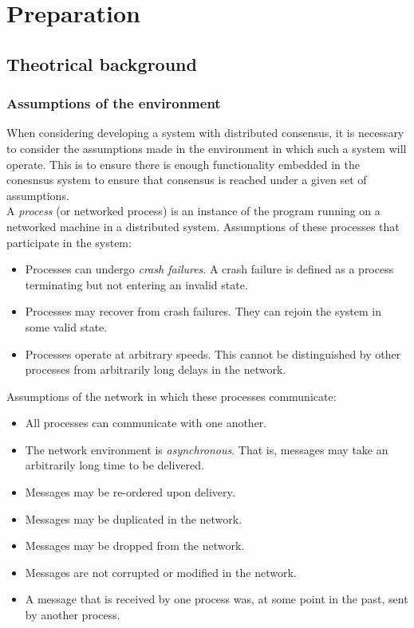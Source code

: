 \chapter{Preparation}


\section{Theotrical background}

\subsection{Assumptions of the environment}
When considering developing a system with distributed consensus, it is necessary to consider the assumptions made in the environment in which such a system will operate. This is to ensure there is enough functionality embedded in the conesnsus system to ensure that consensus is reached under a given set of assumptions. \\

A \emph{process} (or networked process) is an instance of the program running on a networked machine in a distributed system. Assumptions of these processes that participate in the system:

\begin{itemize}
  \item Processes can undergo \emph{crash failures}. A crash failure is defined as a process terminating but not entering an invalid state.
  \item Processes may recover from crash failures. They can rejoin the system in some valid state. 
  \item Processes operate at arbitrary speeds. This cannot be distinguished by other processes from arbitrarily long delays in the network.
\end{itemize}

Assumptions of the network in which these processes communicate:

\begin{itemize}
  \item All processes can communicate with one another.
  \item The network environment is \emph{asynchronous}. That is, messages may take an arbitrarily long time to be delivered.
  \item Messages may be re-ordered upon delivery.
  \item Messages may be duplicated in the network.
  \item Messages may be dropped from the network.
  \item Messages are not corrupted or modified in the network.
  \item A message that is received by one process was, at some point in the past, sent by another process.
\end{itemize}

